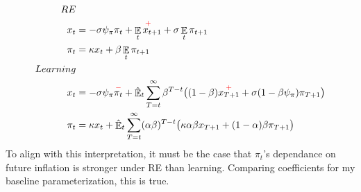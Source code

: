 \documentclass[11pt]{article}
\def \myFigPath {../figures/}
\renewcommand{\[}{\begin{equation}}
\renewcommand{\]}{\end{equation}}
\DeclareMathOperator{\E}{\mathbb{E}}
\def\myMediumFigScale{0.25}
\def\myTinyFigScale{0.16}
\begin{document}
\begin{enumerate}
\begin{align*}
RE& \\
x_t &= - \sigma \psi_{\pi} \pi_t+  \overset{\textcolor{red}{+}}{\E_t x_{t+1}}   + \sigma \E_t \pi_{t+1}  \\
\pi_t &= \kappa x_t +\beta \E_t \pi_{t+1} \\
Learning & \\
x_t &=  -\sigma \psi_{\pi}  \overset{\textcolor{red}{-}}{\pi_t} +\hat{\E}_t \sum_{T=t}^{\infty} \beta^{T-t }\big( (1-\beta) \overset{\textcolor{red}{+}}{x_{T+1}} + \sigma(1- \beta \psi_{\pi})\pi_{T+1} \big)  \\
\pi_t &= \kappa x_t +\hat{\E}_t \sum_{T=t}^{\infty} (\alpha\beta)^{T-t }\big( \kappa \alpha \beta x_{T+1} + (1-\alpha)\beta \pi_{T+1} \big)
\end{align*}
To align with this interpretation, it must be the case that $\pi_t$'s dependance on future inflation is stronger under RE than learning. Comparing coefficients for my baseline parameterization, this is true. 
\end{enumerate}









%
\end{document}
